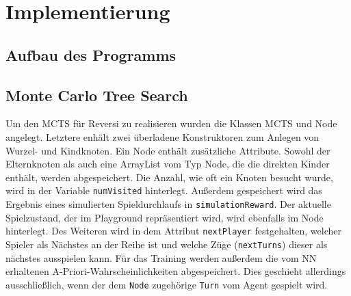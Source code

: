 \documentclass[12pt,a4paper]{article}
\begin{document}
\newpage
\section{Implementierung}

\subsection{Aufbau des Programms}

\subsection{Monte Carlo Tree Search}
Um den MCTS für Reversi zu realisieren wurden die Klassen MCTS und Node angelegt. Letztere enhält zwei überladene Konstruktoren zum Anlegen von Wurzel- und Kindknoten. Ein Node enthält zusätzliche Attribute. Sowohl der Elternknoten als auch eine ArrayList vom Typ Node, die die direkten Kinder enthält, werden abgespeichert. Die Anzahl, wie oft ein Knoten besucht wurde, wird in der Variable \texttt{numVisited} hinterlegt. Außerdem gespeichert wird das Ergebnis eines simulierten Spieldurchlaufs in \texttt{simulationReward}. Der aktuelle Spielzustand, der im Playground repräsentiert wird, wird ebenfalls im Node hinterlegt. Des Weiteren wird in dem Attribut \texttt{nextPlayer} festgehalten, welcher Spieler als Nächstes an der Reihe ist und welche Züge (\texttt{nextTurns}) dieser als nächstes ausspielen kann. Für das Training werden außerdem die vom NN erhaltenen A-Priori-Wahrscheinlichkeiten abgespeichert. Dies geschieht allerdings ausschließlich, wenn der dem \texttt{Node} zugehörige \texttt{Turn} vom Agent gespielt wird.
\end{document}

